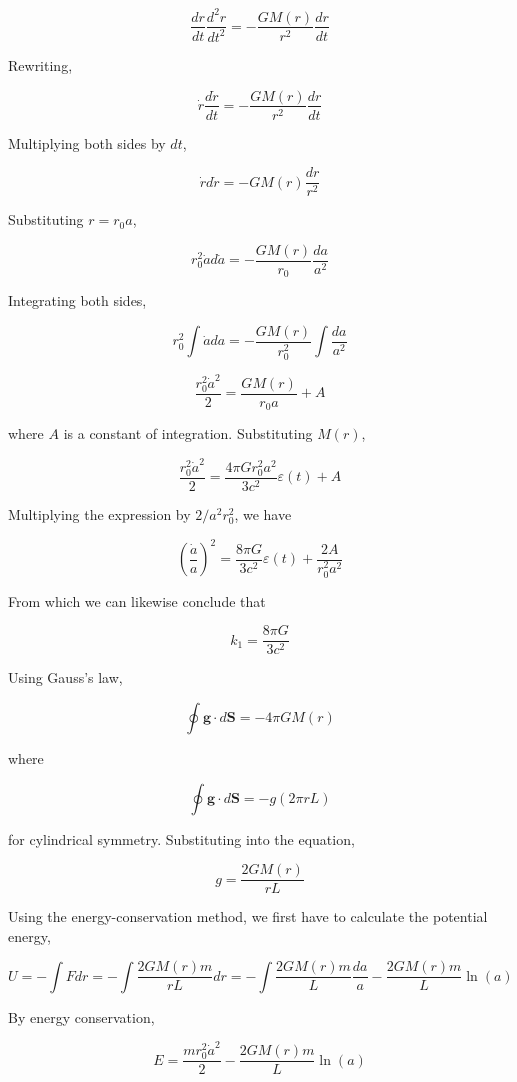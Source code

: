 \documentclass[11pt]{article}
\begin{document}
\begin{pproblem}
\begin{pssolution*}{}{ }
\begin{alternativas}
        \[\frac{dr}{dt} \frac{d^2r}{dt^2} = -\frac{GM(r)}{r^2} \frac{dr}{dt}\]

        Rewriting,

        \[\dot{r} \frac{d\dot{r}}{dt} = -\frac{GM(r)}{r^2} \frac{dr}{dt}\]

        Multiplying both sides by \(dt\),

        \[\dot{r} d\dot{r} = -GM(r) \frac{dr}{r^2}\]

        Substituting \(r = r_0 a\),

        \[r_0^2 \dot{a} d\dot{a} = -\frac{GM(r)}{r_0} \frac{da}{a^2}\]

        Integrating both sides,

        \[r_0^2 \int \dot{a} da = -\frac{GM(r)}{r_0^2} \int \frac{da}{a^2}\]

        \[\frac{r_0^2 \dot{a}^2}{2} = \frac{GM(r)}{r_0 a} + A\]

        where \(A\) is a constant of integration. Substituting \(M(r)\),

        \[\frac{r_0^2 \dot{a}^2}{2} = \frac{4\pi G r_0^2 a^2}{3c^2} \varepsilon(t) + A\]

        Multiplying the expression by \(2/a^2 r_0^2\), we have

        \[\left(\frac{\dot{a}}{a}\right)^2 = \frac{8\pi G}{3c^2} \varepsilon(t) + \frac{2A}{r_0^2 a^2}\]

        From which we can likewise conclude that

        \[\boxed{k_1 = \frac{8\pi G}{3c^2}}\]

        \item Using Gauss's law,

        \[\oint \mathbf{g} \cdot d\mathbf{S} = -4\pi G M(r)\]

        where

        \[\oint \mathbf{g} \cdot d\mathbf{S} = -g(2\pi r L)\]

        for cylindrical symmetry. Substituting into the equation,

        \[g = \frac{2G M(r)}{r L}\]

        Using the energy-conservation method, we first have to calculate the potential energy,

        \[U = -\int F dr = -\int \frac{2GM(r)m}{rL} dr = -\int \frac{2GM(r)m}{L} \frac{da}{a} - \frac{2GM(r)m}{L} \ln(a)\]

        By energy conservation,

        \[E = \frac{m r_0^2 \dot{a}^2}{2} - \frac{2GM(r)m}{L} \ln(a)\]


\end{alternativas}
\end{pssolution*}
\end{pproblem}
\end{document}
